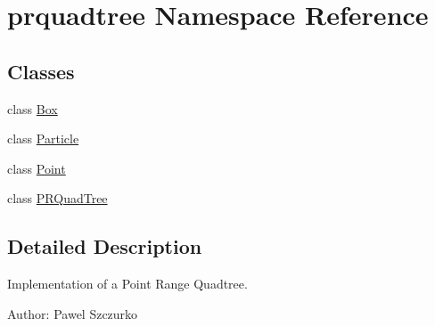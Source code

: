 \hypertarget{namespaceprquadtree}{}\section{prquadtree Namespace Reference}
\label{namespaceprquadtree}
\subsection*{Classes}
\begin{DoxyCompactItemize}
\item 
class \hyperlink{classprquadtree_1_1Box}{Box}
\item 
class \hyperlink{classprquadtree_1_1Particle}{Particle}
\item 
class \hyperlink{classprquadtree_1_1Point}{Point}
\item 
class \hyperlink{classprquadtree_1_1PRQuadTree}{P\+R\+Quad\+Tree}
\end{DoxyCompactItemize}


\subsection{Detailed Description}
\begin{DoxyVerb}Implementation of a Point Range Quadtree.

Author: Pawel Szczurko
\end{DoxyVerb}
 